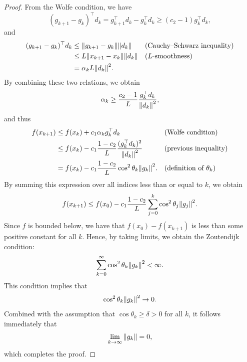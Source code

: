 \documentclass[0_en]{subfiles}
\begin{document}
\begin{proof}
    From the Wolfe condition, we have
    \begin{equation*}
        (g_{k+1} - g_k)^\top d_k
        = g_{k+1}^\top d_k - g_k^\top d_k
        \geq (c_2 - 1) g_k^\top d_k,
    \end{equation*}
    and
    \begin{align*}
        (g_{k+1} - g_k)^\top d_k        & \leq
        \norm{g_{k+1} - g_k} \norm{d_k} &                                        & \text{(Cauchy--Schwarz inequality)}                           \\
                                        & \leq L \norm{x_{k+1} - x_k} \norm{d_k} &                                     & \text{($L$-smoothness)} \\
                                        & = \alpha_k L \norm{d_k}^2.
    \end{align*}
    By combining these two relations, we obtain
    \begin{equation*}
        \alpha_k \geq \frac{c_2 - 1}{L} \frac{g_k^\top d_k}{\norm{d_k}^2},
    \end{equation*}
    and thus
    \begin{align*}
        f(x_{k+1}) & \leq f(x_k) + c_1 \alpha_k g_k^\top d_k                                   &  & \text{(Wolfe condition)}          \\
                   & \leq f(x_k) - c_1 \frac{1 - c_2}{L} \frac{(g_k^\top d_k)^2}{\norm{d_k}^2} &  & \text{(previous inequality)}      \\
                   & = f(x_k) - c_1 \frac{1 - c_2}{L} \cos^2 \theta_k \norm{g_k}^2.            &  & \text{(definition of $\theta_k$)}
    \end{align*}
    By summing this expression over all indices less than or equal to $k$, we obtain
    \begin{equation*}
        f(x_{k+1}) \leq f(x_0) - c_1 \frac{1 - c_2}{L} \sum_{j=0}^k \cos^2 \theta_j \norm{g_j}^2.
    \end{equation*}
    Since $f$ is bounded below, we have that $f(x_0) - f(x_{k+1})$ is less than some positive constant for all $k$.
    Hence, by taking limits, we obtain the Zoutendijk condition:
    \begin{equation*}
        \sum_{k=0}^\infty \cos^2 \theta_k \norm{g_k}^2 < \infty.
    \end{equation*}
    This condition implies that
    \begin{equation*}
        \cos^2 \theta_k \norm{g_k}^2 \to 0.
    \end{equation*}
    Combined with the assumption that $\cos \theta_k \geq \delta > 0$ for all $k$, it follows immediately that
    \begin{equation*}
        \lim_{k \to \infty} \norm{g_k} = 0,
    \end{equation*}
    which completes the proof.
\end{proof}
\end{document}
